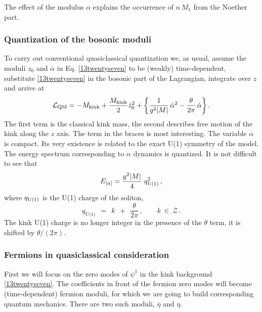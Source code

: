 \documentclass[epsfig,12pt]{article}
\def\beq{\begin{equation}}
\def\eeq{\end{equation}}
\def\beq{\begin{equation}}
\def\eeq{\end{equation}}
\newcommand{\mc}[1]{\mathcal{#1}}
\begin{document}
	The effect of the modulus $\alpha$ explains the occurrence of 
	$n\,M_1$ from the Noether part.



\subsubsection{Quantization of the bosonic moduli}

	To carry out  conventional
	quasiclassical quantization we, as usual,
	assume the moduli $z_0$ and $\alpha$ in Eq. \eqref{13twentyseven}
	to be (weakly) time-dependent, substitute  \eqref{13twentyseven}
	in the bosonic part of the Lagrangian, integrate over $z$
	and arrive at
\beq
{\cal L}_{\rm QM} = -M_{\rm kink} +\frac{M_{\rm kink}}{2} \dot z_0^2 
+\left\{\frac{1}{g^2|M|}\, \dot\alpha^2  
-\frac{\theta}{2\pi}\,\dot\alpha
\right\}.
\label{13twentynine}
\eeq
	The first term is the classical kink mass, the second describes
	free motion of the kink along the $z$ axis.
	The term in the braces is most interesting.
	The variable $\alpha$ is compact.
	Its very existence is related to the exact U(1) symmetry of the model.
	The energy spectrum corresponding
	to $\alpha$ dynamics is quantized.
	It is not difficult to see that
\beq
E_{[\alpha ]}= \frac{g^2 |M|}{4}\,\, q_{\rm U(1)}^2\,,
\label{13thirty}
\eeq
	where 
$ q_{\rm U(1)}$ 
	is the U(1) charge of the soliton,
\beq
 q_\text{U(1)} ~~=~~ k ~~+~~ \frac{\theta}{2\pi}\,,\qquad k ~\in~ \mc{Z}\,.
\label{13thirtyone}
\eeq
	The kink U(1) charge is no longer integer
	in the presence of the $\theta$ term, it is shifted by $\theta/(2\pi )$.


\subsubsection{Fermions in quasiclassical consideration}

	First we will  focus on the 
	zero modes of $\psi^1$ in the kink background \eqref{13twentyseven}.
	The coefficients
	in front of the fermion zero modes will become (time-dependent)
	 fermion moduli, for which we are going to build
	corresponding quantum mechanics. 
	There are two such moduli, $\bar\eta$ and $\eta$.
\end{document}
